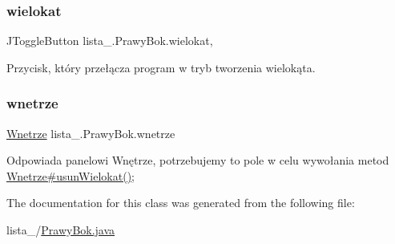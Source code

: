 \subsubsection{\texorpdfstring{wielokat}{wielokat}}
{\footnotesize\ttfamily J\+Toggle\+Button lista\+\_.\+Prawy\+Bok.\+wielokat\hspace{0.3cm}{\ttfamily [static]}, {\ttfamily [package]}}

Przycisk, który przełącza program w tryb tworzenia wielokąta. \mbox{\label{classlista__5_1_1_prawy_bok_a78d3ca2516dbab20a29c94c57b83c071}} 
\subsubsection{\texorpdfstring{wnetrze}{wnetrze}}
{\footnotesize\ttfamily \mbox{\hyperlink{classlista__5_1_1_wnetrze}{Wnetrze}} lista\+\_.\+Prawy\+Bok.\+wnetrze\hspace{0.3cm}{\ttfamily [private]}}

Odpowiada panelowi Wnętrze, potrzebujemy to pole w celu wywołania metod \mbox{\hyperlink{classlista__5_1_1_wnetrze_aa5e96d1ba61b233b93c6d8a71931be07}{Wnetrze\#usun\+Wielokat()}}; 

The documentation for this class was generated from the following file\+:\begin{DoxyCompactItemize}
\item 
lista\+\_/\mbox{\hyperlink{_prawy_bok_8java}{Prawy\+Bok.\+java}}\end{DoxyCompactItemize}

